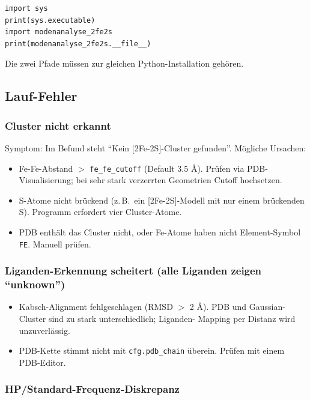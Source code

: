 \documentclass[11pt,a4paper,twoside]{article}
\theoremstyle{remark}
\begin{document}
\begin{lstlisting}[style=python]
import sys
print(sys.executable)
import modenanalyse_2fe2s
print(modenanalyse_2fe2s.__file__)
\end{lstlisting}

Die zwei Pfade m\"ussen zur gleichen Python-Installation geh\"oren.

\subsection{Lauf-Fehler}

\subsubsection*{Cluster nicht erkannt}

Symptom: Im Befund steht ``Kein {[}2Fe-2S{]}-Cluster gefunden''. M\"ogliche
Ursachen:

\begin{itemize}
  \item Fe-Fe-Abstand $>$ \texttt{fe\_fe\_cutoff} (Default 3.5 \AA{}).
        Pr\"ufen via PDB-Visualisierung; bei sehr stark verzerrten
        Geometrien Cutoff hochsetzen.
  \item S-Atome nicht br\"uckend (z.\,B.\ ein {[}2Fe-2S{]}-Modell mit
        nur einem br\"uckenden S). Programm erfordert vier Cluster-Atome.
  \item PDB enth\"alt das Cluster nicht, oder Fe-Atome haben nicht
        Element-Symbol \texttt{FE}. Manuell pr\"ufen.
\end{itemize}

\subsubsection*{Liganden-Erkennung scheitert (alle Liganden zeigen ``unknown'')}

\begin{itemize}
  \item Kabsch-Alignment fehlgeschlagen (RMSD $>$ 2 \AA{}). PDB und
        Gaussian-Cluster sind zu stark unterschiedlich; Liganden-
        Mapping per Distanz wird unzuverl\"assig.
  \item PDB-Kette stimmt nicht mit \texttt{cfg.pdb\_chain}
        \"uberein. Pr\"ufen mit einem PDB-Editor.
\end{itemize}

\subsubsection*{HP/Standard-Frequenz-Diskrepanz}
\end{document}
